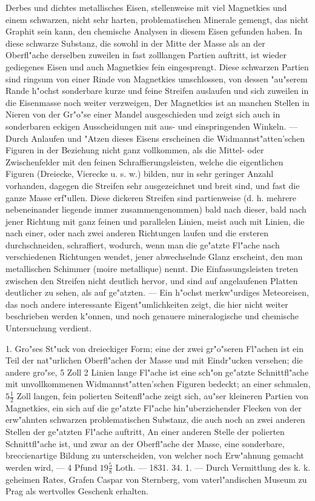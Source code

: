 \documentclass[a4paper, 11pt, oneside, polutonikogreek, german]{article}
\begin{document}
Derbes und dichtes metallisches Eisen, stellenweise mit viel Magnetkies und einem schwarzen, nicht sehr harten, problematischen Minerale gemengt, das nicht Graphit sein kann, den chemische Analysen in diesem Eisen gefunden haben. In diese schwarze Substanz, die sowohl in der Mitte der Masse als an der Oberfl"ache derselben zuweilen in fast zolllangen Partien auftritt, ist wieder gediegenes Eisen und auch Magnetkies fein eingesprengt. Diese schwarzen Partien sind ringsum von einer Rinde von Magnetkies umschlossen, von dessen "au"serem Rande h"ochst sonderbare kurze und feine Streifen auslaufen und sich zuweilen in die Eisenmasse noch weiter verzweigen, Der Magnetkies ist an manchen Stellen in Nieren von der Gr"o"se einer Mandel ausgeschieden und zeigt sich auch in sonderbaren eckigen Ausscheidungen mit aus- und einspringenden Winkeln. --- Durch Anlaufen und "Atzen dieses Eisens erscheinen die Widmannst"atten'schen Figuren in der Beziehung nicht ganz vollkommen, als die Mittel- oder Zwischenfelder mit den feinen Schraffierungsleisten, welche die eigentlichen Figuren (Dreiecke, Vierecke u. s. w.) bilden, nur in sehr geringer Anzahl vorhanden, dagegen die Streifen sehr ausgezeichnet und breit sind, und fast die ganze Masse erf"ullen. Diese dickeren Streifen sind partienweise (d. h. mehrere nebeneinander liegende immer zusammengenommen) bald nach dieser, bald nach jener Richtung mit ganz feinen und parallelen Linien, meist auch mit Linien, die nach einer, oder nach zwei anderen Richtungen laufen und die ersteren durchschneiden, schraffiert, wodurch, wenn man die ge"atzte Fl"ache nach verschiedenen Richtungen wendet, jener abwechselnde Glanz erscheint, den man metallischen Schimmer (moire metallique) nennt. Die Einfassungsleisten treten zwischen den Streifen nicht deutlich hervor, und sind auf angelaufenen Platten deutlicher zu sehen, als auf ge"atzten. --- Ein h"ochst merkw"urdiges Meteoreisen, das noch andere interessante Eigent"umlichkeiten zeigt, die hier nicht weiter beschrieben werden k"onnen, und noch genauere mineralogische und chemische Untersuchung verdient.

1. Gro"ses St"uck von dreieckiger Form; eine der zwei gr"o"seren Fl"achen ist ein Teil der nat"urlichen Oberfl"achen der Masse und mit Eindr"ucken versehen; die andere gro"se, 5 Zoll 2 Linien lange Fl"ache ist eine sch"on ge"atzte Schnittfl"ache mit unvollkommenen Widmannst"atten'schen Figuren bedeckt; an einer schmalen, $\mathfrak{5\frac{1}{2}}$ Zoll langen, fein polierten Seitenfl"ache zeigt sich, au"ser kleineren Partien von Magnetkies, ein sich auf die ge"atzte Fl"ache hin"uberziehender Flecken von der erw"ahnten schwarzen problematischen Substanz, die auch noch an zwei anderen Stellen der ge"atzten Fl"ache auftritt, An einer anderen Stelle der polierten Schnittfl"ache ist, und zwar an der Oberfl"ache der Masse, eine sonderbare, breccienartige Bildung zu unterscheiden, von welcher noch Erw"ahnung gemacht werden wird, --- 4 Pfund $\mathfrak{19\frac{5}{8}}$ Loth. --- 1831. 34. 1. --- Durch Vermittlung des k. k. geheimen Rates, Grafen Caspar von Sternberg, vom vaterl"andischen Museum zu Prag als wertvolles Geschenk erhalten.
\end{document}
